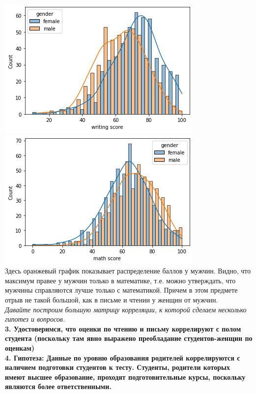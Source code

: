 \documentclass[12pt,a4paper]{article}
\begin{document}
\includegraphics{scores_mf_writing} \\

\includegraphics{scores_mf_math} \\

Здесь оранжевый график показывает распределение баллов у мужчин. Видно, что максимум правее у мужчин только в математике, т.е. можно утверждать, что мужчины справляются лучше только с математикой. Причем в этом предмете отрыв не такой большой, как в письме и чтении у женщин от мужчин. \\

\textit{Давайте построим большую матрицу корреляции, к которой сделаем несколько гипотез и вопросов.
}\\


\textbf{3. Удостоверимся, что оценки по чтению и письму коррелируют с полом студента (поскольку там явно выражено преобладание студентов-женщин по оценкам)}\\

\textbf{4. Гипотеза: Данные по уровню образования родителей коррелируются с наличием подготовки студентов к тесту. Студенты, родители которых имеют высшее образование, проходят подготовительные курсы, поскольку являются более ответственными.}\\
\end{document}
